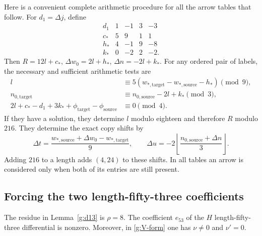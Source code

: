Here is a convenient complete arithmetic procedure for all
the arrow tables that follow.  For $d_1=\Delta j$, define
\begin{equation}\label{g:arrow-rule}
\begin{array}{c|rrrr}
 d_1&1&-1&3&-3\\\hline
 c_*&5&9&1&1\\
 h_*&4&-1&9&-8\\
 k_*&0&-2&2&-2.
\end{array}
\end{equation}
Then $R=12l+c_*$, $\Delta w_0=2l+h_*$,
$\Delta n=-2l+k_*$.  For any ordered pair of labels,
the necessary and sufficient arithmetic tests are
\begin{align}
 l&\equiv5(w_{*,\mathrm{target}}-w_{*,\mathrm{source}}-h_*)
       \pmod9,\label{g:l-congruence}\\
 n_{0,\mathrm{target}}&\equiv n_{0,\mathrm{source}}-2l+k_*
       \pmod3,\label{g:n-congruence}\\
 2l+c_*-d_1+3k_*+\phi_{\mathrm{target}}
       -\phi_{\mathrm{source}}&\equiv0\pmod4.
       \label{g:four-congruence}
\end{align}
If they have a solution, they determine $l$ modulo eighteen
and therefore $R$ modulo $216$.  They determine the exact
copy shifts by
\begin{equation}\label{g:copy-shifts}
 \Delta t=\frac{w_{*,\mathrm{source}}+\Delta w_0
                    -w_{*,\mathrm{target}}}{9},
 \qquad
 \Delta u=-2\left\lfloor
       \frac{n_{0,\mathrm{source}}+\Delta n}{3}
                    \right\rfloor.
\end{equation}
Adding $216$ to a length adds $(4,24)$ to these shifts.
In all tables an arrow is considered only when both of its
entries are still present.

\subsection{Forcing the two length-fifty-three coefficients}

\begin{proposition}\label{g:rho-and-e53}
The residue in Lemma~\ref{g:d13} is $\rho=8$.
The coefficient $e_{53}$ of the $H$ length-fifty-three
differential is nonzero.  Moreover, in \eqref{g:V-form}
one has $\nu\ne0$ and $\nu'=0$.
\end{proposition}

